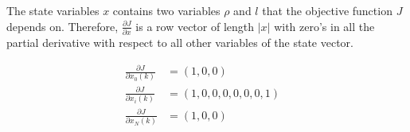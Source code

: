 
The state variables $x$ contains two variables $\rho$ and $l$ that the objective function $J$ depends on. Therefore, $\frac{\partial J}{\partial x}$ is a row vector of length $\left | {x} \right |$ with zero's in all the partial derivative with respect to all other variables of the state vector. 

\begin{align*}
\frac{\partial J}{\partial x_0(k)} &= (1, 0, 0)& \\
\frac{\partial J}{\partial x_i(k)} &= (1, 0, 0, 0, 0, 0, 0, 1)& \\
\frac{\partial J}{\partial x_N(k)} &= (1, 0, 0)&
\end{align*}




